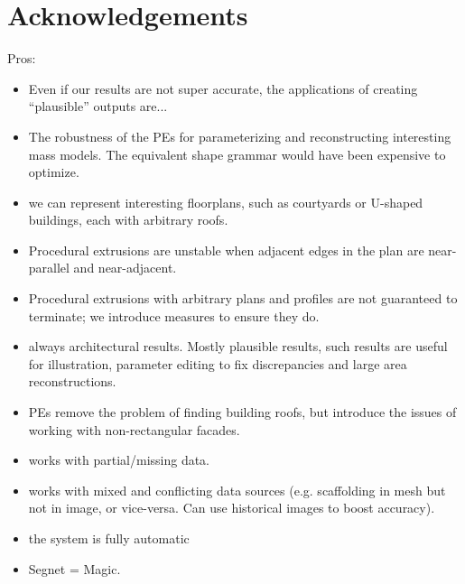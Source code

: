 \section*{Acknowledgements} 



\newpage



Pros:
\begin{itemize}
    \item Even if our results are not super accurate, the applications of creating ``plausible'' outputs are...
    \item The robustness of the PEs for parameterizing and reconstructing interesting mass models. The equivalent shape grammar would have been expensive to optimize. 
    \item we can represent interesting floorplans, such as courtyards or U-shaped buildings, each with arbitrary roofs.
    \item Procedural extrusions are unstable when adjacent edges in the plan are near-parallel and near-adjacent.
    \item Procedural extrusions with arbitrary plans and profiles are not guaranteed to terminate; we introduce measures to ensure they do.
    \item always architectural results. Mostly plausible results, such results are useful for illustration, parameter editing to fix discrepancies and large area reconstructions.
    \item PEs remove the problem of finding building roofs, but introduce the issues of working with non-rectangular facades.
    \item works with partial/missing data. 
    \item works with mixed and conflicting data sources (e.g. scaffolding in mesh but not in image, or vice-versa. Can use historical images to boost accuracy).
    \item the system is fully automatic
    \item Segnet = Magic.
\end{itemize}



